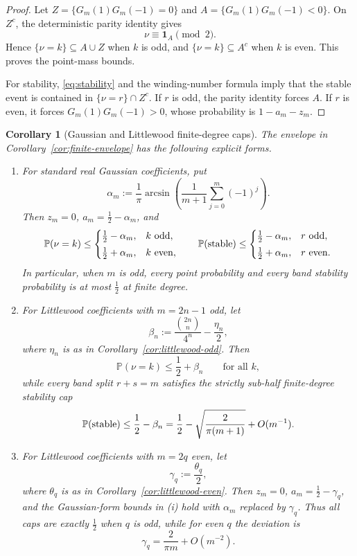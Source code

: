 \documentclass[11pt]{article}
\newtheorem{corollary}[theorem]{Corollary}
\newcommand{\PP}{\mathbb{P}}
\begin{document}
\begin{proof}
Let \(Z=\{G_m(1)G_m(-1)=0\}\) and \(A=\{G_m(1)G_m(-1)<0\}\).  On \(Z^c\), the
deterministic parity identity gives
\[
\nu\equiv\mathbf1_A\pmod2 .
\]
Hence \(\{\nu=k\}\subseteq A\cup Z\) when \(k\) is odd, and
\(\{\nu=k\}\subseteq A^c\) when \(k\) is even.  This proves the point-mass
bounds.

For stability, \eqref{eq:stability} and the winding-number formula imply that
the stable event is contained in \(\{\nu=r\}\cap Z^c\).  If \(r\) is odd, the
parity identity forces \(A\).  If \(r\) is even, it forces
\(G_m(1)G_m(-1)>0\), whose probability is \(1-a_m-z_m\).
\end{proof}

\begin{corollary}[Gaussian and Littlewood finite-degree caps]\label{cor:special-envelope}
The envelope in Corollary~\ref{cor:finite-envelope} has the following explicit
forms.
\begin{enumerate}
\item[(i)] For standard real Gaussian coefficients, put
\[
\alpha_m:=\frac1\pi
  \arcsin\!\left(\frac{1}{m+1}\sum_{j=0}^{m}(-1)^j\right).
\]
Then \(z_m=0\), \(a_m=\tfrac12-\alpha_m\), and
\[
\PP(\nu=k)\le
\begin{cases}
\tfrac12-\alpha_m,& k\ {\rm odd},\\[1mm]
\tfrac12+\alpha_m,& k\ {\rm even},
\end{cases}
\qquad
\PP({\rm stable})\le
\begin{cases}
\tfrac12-\alpha_m,& r\ {\rm odd},\\[1mm]
\tfrac12+\alpha_m,& r\ {\rm even}.
\end{cases}
\]
In particular, when \(m\) is odd, every point probability and every band
stability probability is at most \(\tfrac12\) at finite degree.

\item[(ii)] For Littlewood coefficients with \(m=2n-1\) odd, let
\[
\beta_n:=\frac{\binom{2n}{n}}{4^n}-\frac{\eta_n}{2},
\]
where \(\eta_n\) is as in Corollary~\ref{cor:littlewood-odd}.  Then
\[
\PP(\nu=k)\le \frac12+\beta_n\qquad\text{for all }k,
\]
while every band split \(r+s=m\) satisfies the strictly sub-half finite-degree
stability cap
\[
\PP({\rm stable})\le\frac12-\beta_n
=\frac12-\sqrt{\frac{2}{\pi(m+1)}}+O(m^{-1}).
\]

\item[(iii)] For Littlewood coefficients with \(m=2q\) even, let
\[
\gamma_q:=\frac{\theta_q}{2},
\]
where \(\theta_q\) is as in Corollary~\ref{cor:littlewood-even}.  Then \(z_m=0\),
\(a_m=\tfrac12-\gamma_q\), and the Gaussian-form bounds in {\rm(i)} hold with
\(\alpha_m\) replaced by \(\gamma_q\).  Thus all caps are exactly
\(\tfrac12\) when \(q\) is odd, while for even \(q\) the deviation is
\[
\gamma_q=\frac{2}{\pi m}+O(m^{-2}).
\]
\end{enumerate}
\end{corollary}
\end{document}
